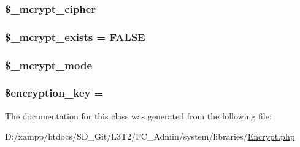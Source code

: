 \subsubsection[{\$\+\_\+mcrypt\+\_\+cipher}]{\setlength{\rightskip}{0pt plus 5cm}\$\+\_\+mcrypt\+\_\+cipher\hspace{0.3cm}{\ttfamily [protected]}}\label{class_c_i___encrypt_ab2cdedd99c4818b191c667f5e081a2db}
\hypertarget{class_c_i___encrypt_aaf4246798dad057cc4e294706e5e4e37}{}
\subsubsection[{\$\+\_\+mcrypt\+\_\+exists}]{\setlength{\rightskip}{0pt plus 5cm}\$\+\_\+mcrypt\+\_\+exists = F\+A\+L\+S\+E\hspace{0.3cm}{\ttfamily [protected]}}\label{class_c_i___encrypt_aaf4246798dad057cc4e294706e5e4e37}
\hypertarget{class_c_i___encrypt_ace4d98b5320c7fe75e6a38505abcdb82}{}
\subsubsection[{\$\+\_\+mcrypt\+\_\+mode}]{\setlength{\rightskip}{0pt plus 5cm}\$\+\_\+mcrypt\+\_\+mode\hspace{0.3cm}{\ttfamily [protected]}}\label{class_c_i___encrypt_ace4d98b5320c7fe75e6a38505abcdb82}
\hypertarget{class_c_i___encrypt_a35bbf76a5bcca90ca9b39368ed28121c}{}
\subsubsection[{\$encryption\+\_\+key}]{\setlength{\rightskip}{0pt plus 5cm}\$encryption\+\_\+key = \textquotesingle{}\textquotesingle{}}\label{class_c_i___encrypt_a35bbf76a5bcca90ca9b39368ed28121c}


The documentation for this class was generated from the following file\+:\begin{DoxyCompactItemize}
\item 
D\+:/xampp/htdocs/\+S\+D\+\_\+\+Git/\+L3\+T2/\+F\+C\+\_\+\+Admin/system/libraries/\hyperlink{system_2libraries_2_encrypt_8php}{Encrypt.\+php}\end{DoxyCompactItemize}
